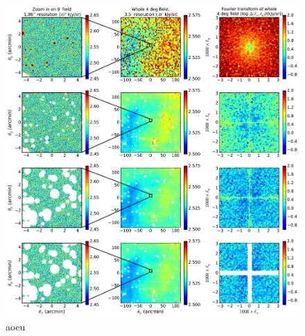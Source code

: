 \documentclass{emulateapj}
\begin{document}
\begin{figure}[h]
\centering
\includegraphics[width=7in]{images/big_foreground_masking_study_2_magoffset=20_56+0_274.pdf}
\caption{aoeu}
\label{fig:bigfgmaskingstudy}
\end{figure}
\end{document}
